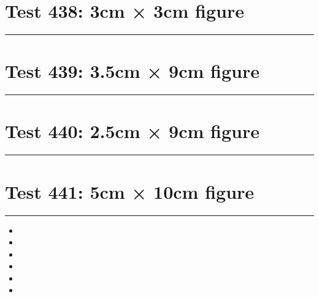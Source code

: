 \documentclass[a4paper,11pt]{article}
\begin{document}
\section*{Test 438: 3cm × 3cm figure}
\begin{swarmwrap}%
  \begin{minipage}[t]{3cm}
    \centering
    \rule{\linewidth}{3cm}
  \end{minipage}%
\end{swarmwrap}%
\swarmwrapnext
\lipsum[113]
\lipsum[114]
\lipsum[115]
\lipsum[116]
\lipsum[117]
\section*{Test 439: 3.5cm × 9cm figure}
\begin{swarmwrap}%
  \begin{minipage}[t]{3cm}
    \centering
    \rule{\linewidth}{9cm}
  \end{minipage}%
\end{swarmwrap}%
\swarmwrapnext
\lipsum[88]
\lipsum[89]
\lipsum[90]
\lipsum[91]
\lipsum[92]
\lipsum[93]
\section*{Test 440: 2.5cm × 9cm figure}
\begin{swarmwrap}%
  \begin{minipage}[t]{2cm}
    \centering
    \rule{\linewidth}{9cm}
  \end{minipage}%
\end{swarmwrap}%
\swarmwrapnext
\lipsum[96]
\lipsum[97]
\lipsum[98]
\lipsum[99]
\lipsum[100]
\lipsum[101]
\section*{Test 441: 5cm × 10cm figure}
\begin{swarmwrap}%
  \begin{minipage}[t]{5cm}
    \centering
    \rule{\linewidth}{10cm}
  \end{minipage}%
\end{swarmwrap}%
\swarmwrapnext
\lipsum[22]
\begin{itemize}
  \item \lipsum[23][1-3]
  \item \lipsum[24][1-3]
  \item \lipsum[25][1-3]
  \item \lipsum[26][1-3]
  \item \lipsum[27][1-3]
  \item \lipsum[28][1-3]
\end{itemize}
\end{document}
